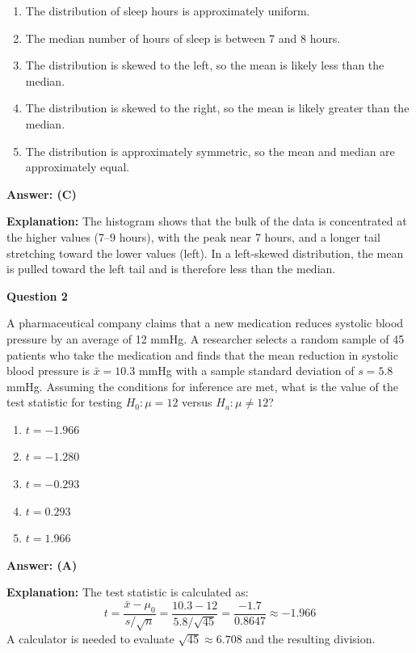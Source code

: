 \documentclass[12pt]{article}
\newcommand{\answerkey}[1]{\textbf{Answer: #1}}
\begin{document}
\begin{enumerate}[label=(\Alph*)]
    \item The distribution of sleep hours is approximately uniform.
    \item The median number of hours of sleep is between 7 and 8 hours.
    \item The distribution is skewed to the left, so the mean is likely less than the median.
    \item The distribution is skewed to the right, so the mean is likely greater than the median.
    \item The distribution is approximately symmetric, so the mean and median are approximately equal.
\end{enumerate}

\answerkey{(C)}

\textbf{Explanation:} The histogram shows that the bulk of the data is concentrated at the higher values (7--9 hours), with the peak near 7 hours, and a longer tail stretching toward the lower values (left). In a left-skewed distribution, the mean is pulled toward the left tail and is therefore less than the median.

\vspace{1cm}

\noindent\textbf{Question 2}

A pharmaceutical company claims that a new medication reduces systolic blood pressure by an average of 12 mmHg. A researcher selects a random sample of 45 patients who take the medication and finds that the mean reduction in systolic blood pressure is $\bar{x} = 10.3$ mmHg with a sample standard deviation of $s = 5.8$ mmHg. Assuming the conditions for inference are met, what is the value of the test statistic for testing $H_0: \mu = 12$ versus $H_a: \mu \neq 12$?

\begin{enumerate}[label=(\Alph*)]
    \item $t = -1.966$
    \item $t = -1.280$
    \item $t = -0.293$
    \item $t = 0.293$
    \item $t = 1.966$
\end{enumerate}

\answerkey{(A)}

\textbf{Explanation:} The test statistic is calculated as:
\[
t = \frac{\bar{x} - \mu_0}{s / \sqrt{n}} = \frac{10.3 - 12}{5.8 / \sqrt{45}} = \frac{-1.7}{0.8647} \approx -1.966
\]
A calculator is needed to evaluate $\sqrt{45} \approx 6.708$ and the resulting division.
\end{document}
